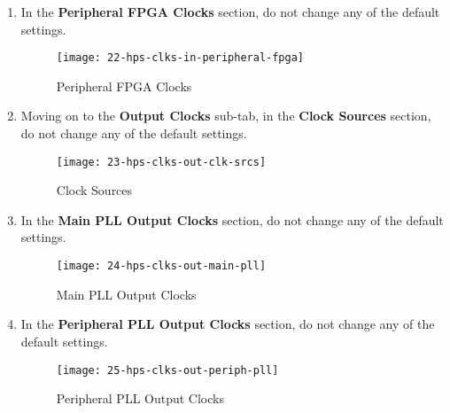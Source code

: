\begin{flushleft}
\begin{enumerate}[
	label=\textbf{Step \arabic*.},
	leftmargin=*,
	widest={00},
	align=left]
\newpage

\item In the \textbf{Peripheral FPGA Clocks} section, do not change any of the default settings.

\begin{figure}[H]
\centering
\texttt{[image: 22-hps-clks-in-peripheral-fpga]}
\caption{Peripheral FPGA Clocks}
\label{fig:22-hps-clks-in-peripheral-fpga}
\end{figure}

\item Moving on to the \textbf{Output Clocks} sub-tab, in the \textbf{Clock Sources} section, do not change any of the default settings.

\begin{figure}[H]
\centering
\texttt{[image: 23-hps-clks-out-clk-srcs]}
\caption{Clock Sources}
\label{fig:23-hps-clks-out-clk-srcs}
\end{figure}

\item In the \textbf{Main PLL Output Clocks} section, do not change any of the default settings.

\begin{figure}[H]
\centering
\texttt{[image: 24-hps-clks-out-main-pll]}
\caption{Main PLL Output Clocks}
\label{fig:24-hps-clks-out-main-pll}
\end{figure}

\newpage

\item In the \textbf{Peripheral PLL Output Clocks} section, do not change any of the default settings.

\begin{figure}[H]
\centering
\texttt{[image: 25-hps-clks-out-periph-pll]}
\caption{Peripheral PLL Output Clocks}
\label{fig:25-hps-clks-out-periph-pll}
\end{figure}


\end{enumerate}
\end{flushleft}
